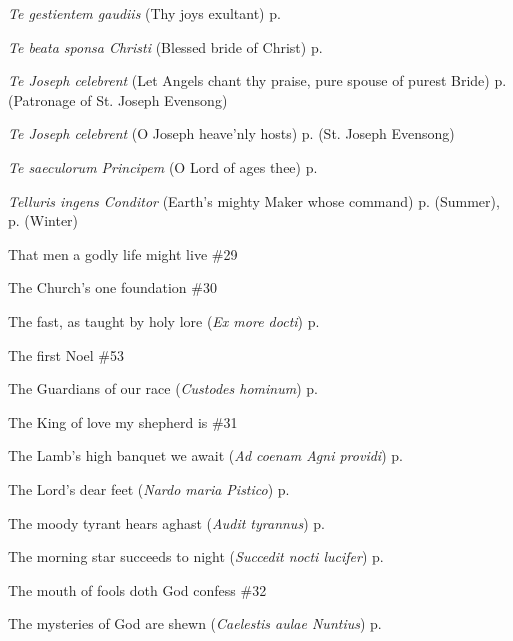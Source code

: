 \begin{hangparas}{1.25em}{1}
\par\noindent
\textit{Te gestientem gaudiis} (Thy joys exultant) \dotfill p. \pageref{HolyRosaryEvensongII}
\par\noindent
\textit{Te beata sponsa Christi} (Blessed bride of Christ) \dotfill p. \pageref{ScholasticaEvensong}
\par\noindent
\textit{Te Joseph celebrent} (Let Angels chant thy praise, pure spouse of purest Bride) \dotfill p. \pageref{PatronageEvensong} (Patronage of St. Joseph Evensong)
\par\noindent
\textit{Te Joseph celebrent} (O Joseph heave'nly hosts) \dotfill p. \pageref{JosephEvensong} (St. Joseph Evensong)
\par\noindent
\textit{Te saeculorum Principem} (O Lord of ages thee) \dotfill p. \pageref{ChristTheKingEvensong}
\par\noindent
\textit{Telluris ingens Conditor} (Earth's mighty Maker whose command) \dotfill p. \pageref{TuesdayEvensongSummer} (Summer), p. \pageref{TuesdayEvensongWinter} (Winter)
\par\noindent
That men a godly life might live \dotfill \#29
\par\noindent
The Church's one foundation \dotfill \#30
\par\noindent
The fast, as taught by holy lore (\textit{Ex more docti}) \dotfill p. \pageref{FirstLentInvitatory}
\par\noindent
The first Noel \dotfill \#53
\par\noindent
The Guardians of our race (\textit{Custodes hominum}) \dotfill p. \pageref{GuardianAngelsEvensong}
\par\noindent
The King of love my shepherd is \dotfill \#31
\par\noindent
The Lamb's high banquet we await (\textit{Ad coenam Agni providi}) \dotfill p. \pageref{EasterEvensong}
\par\noindent
The Lord's dear feet (\textit{Nardo maria Pistico}) \dotfill p. \pageref{MaryMagdaleneInvitatory}
\par\noindent
The moody tyrant hears aghast (\textit{Audit tyrannus}) \dotfill p. \pageref{HolyInnocentsInvitatory}
\par\noindent
The morning star succeeds to night (\textit{Succedit nocti lucifer}) \dotfill p. \pageref{AnneMattins}
\par\noindent
The mouth of fools doth God confess \dotfill \#32
\par\noindent
The mysteries of God are shewn (\textit{Caelestis aulae Nuntius}) \dotfill p. \pageref{HolyRosaryEvensong}

\end{hangparas}

